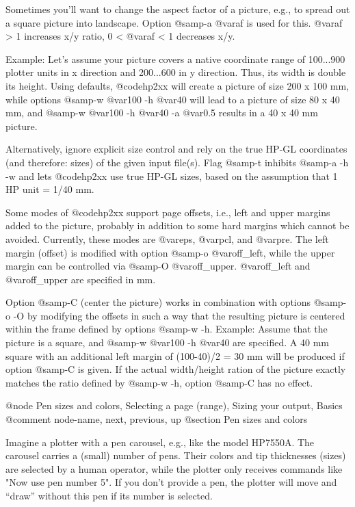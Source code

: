 Sometimes you'll want to change the aspect factor of a picture, e.g., to
spread out a square picture into landscape. Option @samp{-a @var{af}} is used
for this. @var{af} > 1 increases x/y ratio, 0 < @var{af} < 1 decreases x/y.

Example: Let's assume your picture covers a native coordinate range of
100...900 plotter units in x direction and 200...600 in y direction.
Thus, its width is double its height.
Using defaults, @code{hp2xx} will create a picture of size 200 x 100 mm,
while options @samp{-w @var{100} -h @var{40}} will lead to a picture of
size 80 x 40 mm, and @samp{-w @var{100} -h @var{40} -a @var{0.5}} results
in a 40 x 40 mm picture.

Alternatively, ignore explicit size control and rely on the true
HP-GL coordinates (and therefore: sizes) of the given input file(s).
Flag @samp{-t} inhibits @samp{-a -h -w} and lets @code{hp2xx} use true
HP-GL sizes, based on the assumption that 1 HP unit = 1/40 mm.

Some modes of @code{hp2xx} support page offsets, i.e., left
and upper margins added to the picture, probably in addition to some
hard margins which cannot be avoided. Currently, these modes are
@var{eps}, @var{pcl}, and @var{pre}. The left margin (offset) is modified
with option @samp{-o @var{off_left}}, while the upper margin can be
controlled via @samp{-O @var{off_upper}}. @var{off_left} and @var{off_upper}
are specified in mm.

Option @samp{-C} (center the picture) works in combination with options
@samp{-o -O} by modifying the offsets in such a way that the resulting
picture is centered within the frame defined by options @samp{-w -h}. Example:
Assume that the picture is a square, and @samp{-w @var{100} -h @var{40}}
are specified. A 40 mm square with an additional left margin of
(100-40)/2 = 30 mm will be produced if option @samp{-C} is given.
If the actual width/height ration of the picture exactly matches
the ratio defined by @samp{-w -h}, option @samp{-C} has no effect.



@node Pen sizes and colors, Selecting a page (range), Sizing your output, Basics
@comment  node-name,  next,  previous,  up
@section Pen sizes and colors

Imagine a plotter with a pen carousel, e.g., like the model HP7550A.
The carousel carries a (small) number of pens. Their colors and tip
thicknesses (sizes) are selected by a human operator, while the plotter
only receives commands like "Now use pen number 5". If you don't provide a
pen, the plotter will move and ``draw'' without this pen if its number
is selected.

